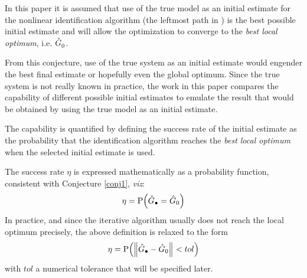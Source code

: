 \begin{conjecture}\label{conj1}
In this paper it is assumed that use of the true model as an initial estimate for the nonlinear identification algorithm (the leftmost path in ) is the best possible initial estimate and will allow the optimization to converge to the \emph{best local optimum}, i.e. $\hat{G}_{\mathrm{0}}^{\mathrm{}}$.
\end{conjecture}
From this conjecture, use of the true system as an initial estimate would engender the best final estimate or hopefully even the global optimum.
Since the true system is not really known in practice, the work in this paper compares the capability of different possible initial estimates to emulate the result that would be obtained by using the true model as an initial estimate. 

The capability is quantified by defining the success rate of the initial estimate as the probability that the identification algorithm reaches the \emph{best local optimum} when the selected initial estimate is used. %



The success rate $\eta$ is expressed mathematically as a probability function, consistent with Conjecture \ref{conj1}, \emph{viz}:
\begin{align}
\eta=\mathrm{P}\!\left( \hat G_\bullet=\hat G_0 \right)
\end{align}
In practice, and since the iterative algorithm usually does not reach the local optimum precisely, the above definition is relaxed to the form
\begin{align}\label{eq:successrateTol}
\eta=\mathrm{P}\!\left(  \left\| \hat G_\bullet-\hat G_0 \right\|_{} < tol \right)
\end{align}
with $tol$ a numerical tolerance that will be specified later.


